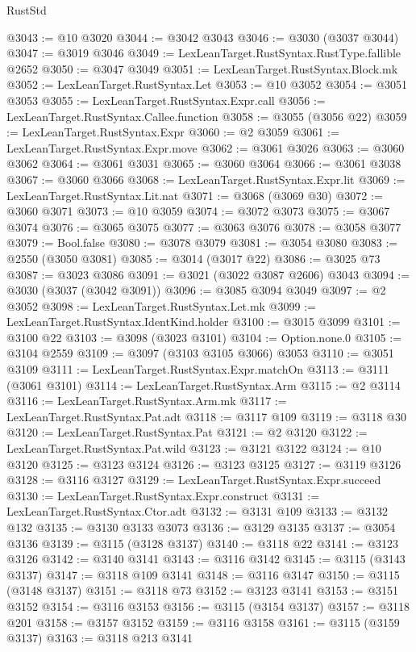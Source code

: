 \begin{lexlean}{RustStd}
\begin{coremodule}
{\begin{coremodule}
{{{{{{{{{{{{{{{{{{{{{{{{{{{{{{{{@3043 := @10 @3020
@3044 := @3042 @3043
@3046 := @3030 (@3037 @3044)
@3047 := @3019 @3046
@3049 := LexLeanTarget.RustSyntax.RustType.fallible @2652
@3050 := @3047 @3049
@3051 := LexLeanTarget.RustSyntax.Block.mk
@3052 := LexLeanTarget.RustSyntax.Let
@3053 := @10 @3052
@3054 := @3051 @3053
@3055 := LexLeanTarget.RustSyntax.Expr.call
@3056 := LexLeanTarget.RustSyntax.Callee.function
@3058 := @3055 (@3056 @22)
@3059 := LexLeanTarget.RustSyntax.Expr
@3060 := @2 @3059
@3061 := LexLeanTarget.RustSyntax.Expr.move
@3062 := @3061 @3026
@3063 := @3060 @3062
@3064 := @3061 @3031
@3065 := @3060 @3064
@3066 := @3061 @3038
@3067 := @3060 @3066
@3068 := LexLeanTarget.RustSyntax.Expr.lit
@3069 := LexLeanTarget.RustSyntax.Lit.nat
@3071 := @3068 (@3069 @30)
@3072 := @3060 @3071
@3073 := @10 @3059
@3074 := @3072 @3073
@3075 := @3067 @3074
@3076 := @3065 @3075
@3077 := @3063 @3076
@3078 := @3058 @3077
@3079 := Bool.false
@3080 := @3078 @3079
@3081 := @3054 @3080
@3083 := @2550 (@3050 @3081)
@3085 := @3014 (@3017 @22)
@3086 := @3025 @73
@3087 := @3023 @3086
@3091 := @3021 (@3022 @3087 @2606) @3043
@3094 := @3030 (@3037 (@3042 @3091))
@3096 := @3085 @3094 @3049
@3097 := @2 @3052
@3098 := LexLeanTarget.RustSyntax.Let.mk
@3099 := LexLeanTarget.RustSyntax.IdentKind.holder
@3100 := @3015 @3099
@3101 := @3100 @22
@3103 := @3098 (@3023 @3101)
@3104 := Option.none.{0}
@3105 := @3104 @2559
@3109 := @3097 (@3103 @3105 @3066) @3053
@3110 := @3051 @3109
@3111 := LexLeanTarget.RustSyntax.Expr.matchOn
@3113 := @3111 (@3061 @3101)
@3114 := LexLeanTarget.RustSyntax.Arm
@3115 := @2 @3114
@3116 := LexLeanTarget.RustSyntax.Arm.mk
@3117 := LexLeanTarget.RustSyntax.Pat.adt
@3118 := @3117 @109
@3119 := @3118 @30
@3120 := LexLeanTarget.RustSyntax.Pat
@3121 := @2 @3120
@3122 := LexLeanTarget.RustSyntax.Pat.wild
@3123 := @3121 @3122
@3124 := @10 @3120
@3125 := @3123 @3124
@3126 := @3123 @3125
@3127 := @3119 @3126
@3128 := @3116 @3127
@3129 := LexLeanTarget.RustSyntax.Expr.succeed
@3130 := LexLeanTarget.RustSyntax.Expr.construct
@3131 := LexLeanTarget.RustSyntax.Ctor.adt
@3132 := @3131 @109
@3133 := @3132 @132
@3135 := @3130 @3133 @3073
@3136 := @3129 @3135
@3137 := @3054 @3136
@3139 := @3115 (@3128 @3137)
@3140 := @3118 @22
@3141 := @3123 @3126
@3142 := @3140 @3141
@3143 := @3116 @3142
@3145 := @3115 (@3143 @3137)
@3147 := @3118 @109 @3141
@3148 := @3116 @3147
@3150 := @3115 (@3148 @3137)
@3151 := @3118 @73
@3152 := @3123 @3141
@3153 := @3151 @3152
@3154 := @3116 @3153
@3156 := @3115 (@3154 @3137)
@3157 := @3118 @201
@3158 := @3157 @3152
@3159 := @3116 @3158
@3161 := @3115 (@3159 @3137)
@3163 := @3118 @213 @3141
}}}}}}}}}}}}}}}}}}}}}}}}}}}}}}}}
\end{coremodule}}
\end{coremodule}
\end{lexlean}
